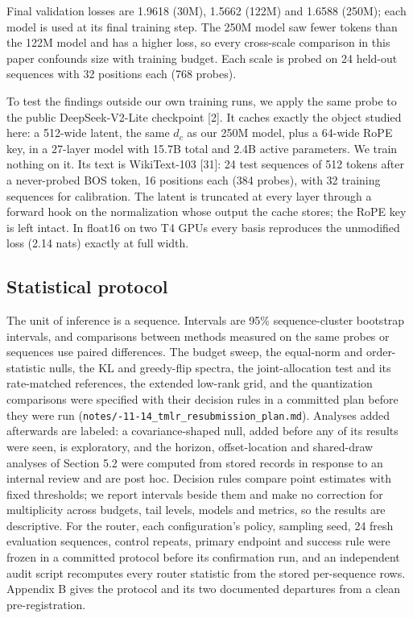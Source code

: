 \documentclass[11pt]{article}
\begin{document}
Final validation losses are 1.9618 (30M), 1.5662 (122M) and 1.6588 (250M); each model is used at its final training step. The 250M model saw fewer tokens than the 122M model and has a higher loss, so every cross-scale comparison in this paper confounds size with training budget. Each scale is probed on 24 held-out sequences with 32 positions each (768 probes).

To test the findings outside our own training runs, we apply the same probe to the public DeepSeek-V2-Lite checkpoint [2]. It caches exactly the object studied here: a 512-wide latent, the same $d_c$ as our 250M model, plus a 64-wide RoPE key, in a 27-layer model with 15.7B total and 2.4B active parameters. We train nothing on it. Its text is WikiText-103 [31]: 24 test sequences of 512 tokens after a never-probed BOS token, 16 positions each (384 probes), with 32 training sequences for calibration. The latent is truncated at every layer through a forward hook on the normalization whose output the cache stores; the RoPE key is left intact. In float16 on two T4 GPUs every basis reproduces the unmodified loss (2.14 nats) exactly at full width.

\subsection{Statistical protocol}

The unit of inference is a sequence. Intervals are 95\% sequence-cluster bootstrap intervals, and comparisons between methods measured on the same probes or sequences use paired differences. The budget sweep, the equal-norm and order-statistic nulls, the KL and greedy-flip spectra, the joint-allocation test and its rate-matched references, the extended low-rank grid, and the quantization comparisons were specified with their decision rules in a committed plan before they were run (\texttt{notes/-11-14\_tmlr\_resubmission\_plan.md}). Analyses added afterwards are labeled: a covariance-shaped null, added before any of its results were seen, is exploratory, and the horizon, offset-location and shared-draw analyses of Section 5.2 were computed from stored records in response to an internal review and are post hoc. Decision rules compare point estimates with fixed thresholds; we report intervals beside them and make no correction for multiplicity across budgets, tail levels, models and metrics, so the results are descriptive. For the router, each configuration's policy, sampling seed, 24 fresh evaluation sequences, control repeats, primary endpoint and success rule were frozen in a committed protocol before its confirmation run, and an independent audit script recomputes every router statistic from the stored per-sequence rows. Appendix B gives the protocol and its two documented departures from a clean pre-registration.
\end{document}
